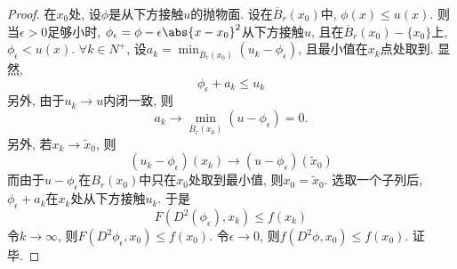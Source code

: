 \begin{proof}
    在$x_0$处, 设$\phi$是从下方接触$u$的抛物面.  设在$\overline{B}_r(x_0)$中, $\phi(x) \le u(x)$.  则当$\epsilon>0$足够小时, $\phi_\epsilon=\phi-\epsilon\abs{x-x_0}^2$从下方接触$u$, 且在$\overline{B}_r(x_0)-\{x_0\}$上, $\phi_\epsilon < u(x)$.  $\forall k\in N^+$, 设$a_k = \min_{\overline{B}_r(x_0)}(u_k-\phi_\epsilon)$, 且最小值在$x_k$点处取到.  显然, 
    \begin{equation}
        \phi_\epsilon + a_k \le u_k
    \end{equation}
    另外, 由于$u_k \to u$内闭一致, 则 
    \begin{equation}
        a_k \to \min_{\overline{B}_r(x_0)}(u-\phi_\epsilon)=0.  
    \end{equation}
    另外, 若$x_k \to \tilde{x}_0$, 则
    \begin{equation}
        (u_k-\phi_\epsilon)(x_k) \to (u-\phi_\epsilon)(\tilde{x}_0)
    \end{equation}
    而由于$u-\phi_\epsilon$在$B_r(x_0)$中只在$x_0$处取到最小值, 则$x_0=\tilde{x}_0$.  选取一个子列后, $\phi_\epsilon+a_k$在$x_k$处从下方接触$u_k$.  于是
    \begin{equation}
        F(D^2(\phi_\epsilon), x_k) \le f(x_k)
    \end{equation}
    令$k \to \infty$, 则$F(D^2\phi_\epsilon, x_0) \le f(x_0)$.  令$\epsilon \to 0$, 则$f(D^2\phi, x_0) \le f(x_0)$.  证毕.  
\end{proof}
